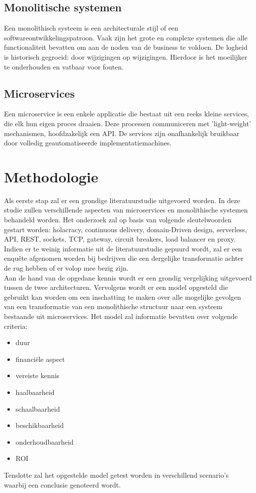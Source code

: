 \subsection{Monolitische systemen}
Een monolithisch systeem is een architecturale stijl of een softwareontwikkelingspatroon. Vaak zijn het grote en complexe systemen die alle functionaliteit bevatten om aan de noden van de business te voldoen. De logheid is historisch gegroeid: door wijzigingen op wijzigingen. Hierdoor is het moeilijker te onderhouden en vatbaar voor fouten.
~\autocite{Monolith2014}

\subsection{Microservices}
Een microservice is een enkele applicatie die bestaat uit een reeks kleine services, die elk hun eigen proces draaien. Deze processen communiceren met 'light-weight' mechanismen, hoofdzakelijk een API. De services zijn onafhankelijk bruikbaar door volledig geautomatiseerde implementatiemachines. 
~\autocite{Microservices2014}

\section{Methodologie}
\label{sec:methodologie}

Als eerste stap zal er een grondige literatuurstudie uitgevoerd worden. In deze studie zullen verschillende aspecten van microservices en monolithische systemen behandeld worden. Het onderzoek zal op basis van volgende sleutelwoorden gestart worden: holacracy, continuous delivery, domain-Driven design, serverless, API, REST, sockets, TCP, gateway, circuit breakers, load balancer en proxy. ~\autocite{Glen2018} ~\autocite{Alshuqayran2016}
Indien er te weinig informatie uit de literatuurstudie gepuurd wordt, zal er een enquête afgenomen worden bij bedrijven die een dergelijke transformatie achter de rug hebben of er volop mee bezig zijn.\\
Aan de hand van de opgedane kennis wordt er een grondig vergelijking uitgevoerd tussen de twee architecturen. Vervolgens wordt er een model opgesteld die gebruikt kan worden om een inschatting te maken over alle mogelijke gevolgen van een transformatie van een monolithische structuur naar een systeem bestaande uit microservices. Het model zal informatie bevatten over volgende criteria:
\begin{itemize}
    \item duur
    \item financiële aspect
    \item vereiste kennis
    \item haalbaarheid
    \item schaalbaarheid
    \item beschikbaarheid
    \item onderhoudbaarheid
    \item ROI
\end{itemize} 
Tenslotte zal het opgestelde model getest worden in verschillend scenario’s waarbij een conclusie genoteerd wordt.

